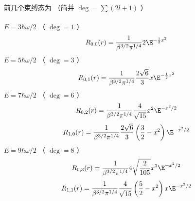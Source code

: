 前几个束缚态为 （简并 $\deg  = \sum {(2l + 1)} $ ）\\ \\
 $E = 3\hbar \omega /2$ （ $\deg  = 1$ ）
\begin{equation}
{R_{0,0}}(r) = \frac{1}{{\beta ^{3/2}}{\pi ^{1/4}}}2{\E^{ - \frac{1}{2}{x^2}}}
\end{equation}
 $E = 5\hbar \omega /2$ （ $\deg  = 3$ ）
\begin{equation}
{R_{0,1}}(r) = \frac{1}{{\beta ^{3/2}}{\pi ^{1/4}}}\frac{2\sqrt 6 }{3}x{\E^{ - \frac{1}{2}{x^2}}}
\end{equation}
 $E = 7\hbar \omega /2$ （ $\deg  = 6$ ）
\begin{equation}
{R_{0,2}}(r) = \frac{1}{{\beta ^{3/2}}{\pi ^{1/4}}}\frac{4}{\sqrt {15} }{x^2}{\E^{ - {x^2}/2}}
\end{equation}
\begin{equation}
{R_{1,0}}(r) = \frac{1}{{\beta ^{3/2}}{\pi ^{1/4}}}\frac{2\sqrt 6 }{3}\left( {\frac{3}{2} - {x^2}} \right){\E^{ - {x^2}/2}}
\end{equation}
 $E = 9\hbar \omega /2$ （ $\deg  = 8$ ）
\begin{equation}
 {R_{0,3}}(r) = \frac{1}{{\beta ^{3/2}}{\pi ^{1/4}}}4\sqrt {\frac{2}{105}} {x^3}{\E^{ - {x^2}/2}}
\end{equation}
\begin{equation}
{R_{1,1}}(r) = \frac{1}{{\beta ^{3/2}}{\pi ^{1/4}}}\frac{4}{\sqrt {15} }\left( {\frac{5}{2} - {x^2}} \right)x{\E^{ - {x^2}/2}}
\end{equation}

 

